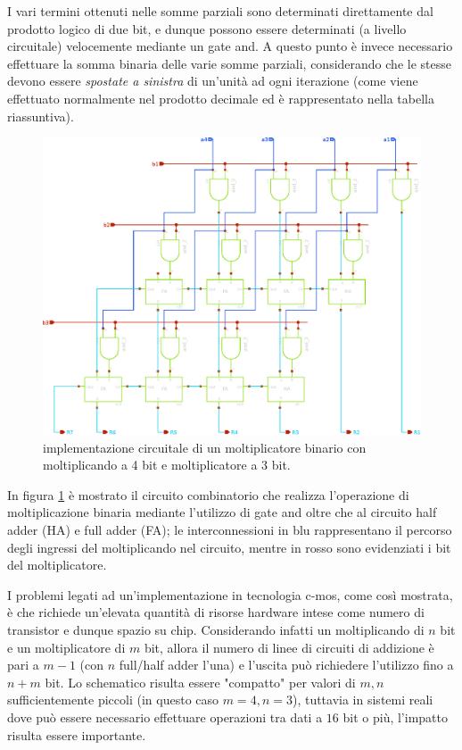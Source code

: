 	I vari termini ottenuti nelle somme parziali sono determinati direttamente dal prodotto logico di due bit, e dunque possono essere determinati (a livello circuitale) velocemente mediante un gate and. A questo punto è invece necessario effettuare la somma binaria delle varie somme parziali, considerando che le stesse devono essere \textit{spostate a sinistra} di un'unità ad ogni iterazione (come viene effettuato normalmente nel prodotto decimale ed è rappresentato nella tabella riassuntiva).
	
	\begin{figure}[bht]
		\centering
		\includegraphics[width=\linewidth]{Immagini/moltiplicatore}
		\caption{implementazione circuitale di un moltiplicatore binario con moltiplicando a 4 bit e moltiplicatore a 3 bit. }
		\label{fig:molt:sch}
	\end{figure}
	
	In figura \ref{fig:molt:sch} è mostrato il circuito combinatorio che realizza l'operazione di moltiplicazione binaria mediante l'utilizzo di gate and oltre che al circuito half adder (HA) e full adder (FA); le interconnessioni in blu rappresentano il percorso degli ingressi del moltiplicando nel circuito, mentre in rosso sono evidenziati i bit del moltiplicatore.
	
	I problemi legati ad un'implementazione in tecnologia c-mos, come così mostrata, è che richiede un'elevata quantità di risorse hardware intese come numero di transistor e dunque spazio su chip. Considerando infatti un moltiplicando di $n$ bit e un moltiplicatore di $m$ bit, allora il numero di linee di circuiti di addizione è pari a $m-1$ (con $n$ full/half adder l'una) e l'uscita può richiedere l'utilizzo fino a $n+m$ bit. Lo schematico risulta essere "compatto" per valori di $m,n$ sufficientemente piccoli (in questo caso $m=4,n=3$), tuttavia in sistemi reali dove può essere necessario effettuare operazioni tra dati a $16$ bit o più, l'impatto risulta essere importante.
	

